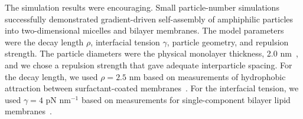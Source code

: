\begin{table}
\vspace{-5pt}
\caption{\label{tab:spectral_force} 
\footnotesize  Relative numerical errors (rel.~err.)$_F = \max_{i}
  \|\mathbf{F}_i-\mathbf{F}_i^{\text{exact}}\|/\|\mathbf{F}_i^{\text{exact}}\|$
  and (rel.~err.)$_G = \max_{i}
  \|\mathbf{G}_i-\mathbf{G}_i^{\text{exact}}\|/\|\mathbf{G}_i^{\text{exact}}\|$
  for force and torque respectively as a function of number of grid
  points $n$ per particle.  The data is for $N = 5$ particles; two of
  the particles are nearly touching at a distance 1\% of particle
  diameter.} 
\end{table}
The simulation results were encouraging. Small particle-number
simulations successfully demonstrated gradient-driven self-assembly of
amphiphilic particles into two-dimensional micelles and bilayer membranes.
The model parameters were the decay length $\rho$, interfacial tension
$\gamma$, particle geometry, and repulsion strength. The particle
diameters were the physical monolayer thickness, 2.0 nm~\cite{Boal}, and
we chose a repulsion strength that gave adequate interparticle spacing.
For the decay length, we used $\rho = 2.5$ nm based on measurements of
hydrophobic attraction between surfactant-coated
membranes~\cite{Eriksson1989, Lin2005, Parsegian, Israelachvili80}. For
the interfacial tension, we used $\gamma = 4$ pN nm$^{-1}$ based on
measurements for single-component bilayer lipid
membranes~\cite{GarciaSaez, KUZMIN2005, Petelska2012, Jackson2016}.

